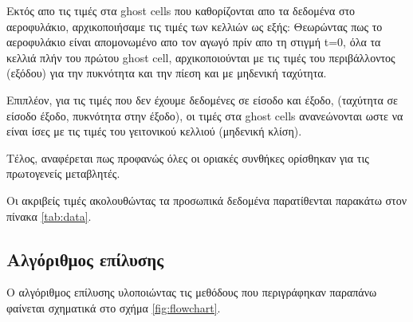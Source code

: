 Εκτός απο τις τιμές στα ghost cells που καθορίζονται απο τα δεδομένα στο αεροφυλάκιο, αρχικοποιήσαμε τις τιμές των κελλιών ως εξής: Θεωρώντας πως το αεροφυλάκιο είναι απομονωμένο απο τον αγωγό πρίν απο τη στιγμή t=0, όλα τα κελλιά πλήν του πρώτου ghost cell, αρχικοποιούνται με τις τιμές του περιβάλλοντος (εξόδου) για την πυκνότητα και την πίεση και με μηδενική ταχύτητα.

Επιπλέον, για τις τιμές που δεν έχουμε δεδομένες σε είσοδο και έξοδο, (ταχύτητα σε είσοδο έξοδο, πυκνότητα στην έξοδο), οι τιμές στα ghost cells ανανεώνονται ωστε να είναι ίσες με τις τιμές του γειτονικού κελλιού (μηδενική κλίση).

Τέλος, αναφέρεται πως προφανώς όλες οι οριακές συνθήκες ορίσθηκαν για τις πρωτογενείς μεταβλητές.

Οι ακριβείς τιμές ακολουθώντας τα προσωπικά δεδομένα παρατίθενται παρακάτω στον πίνακα \ref{tab:data}.

\subsection{Αλγόριθμος επίλυσης}

Ο αλγόριθμος επίλυσης υλοποιώντας τις μεθόδους που περιγράφηκαν παραπάνω φαίνεται σχηματικά στο σχήμα \ref{fig:flowchart}.

\newpage

\setlength{\fboxrule}{2pt} %
\setlength{\fboxsep}{15pt} %

